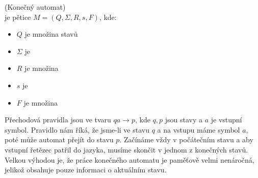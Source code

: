 \begin{defn} (Konečný automat)\\
   je pětice $M = (Q, \Sigma, R, s, F)$, kde:
  \begin{itemize}
    \item $Q$ je množina stavů
    \item $\Sigma$ je 
    \item $R$ je množina 
    \item $s$ je 
    \item $F$ je množina 
  \end{itemize}
\end{defn}

Přechodová pravidla jsou ve tvaru $qa \rightarrow p$, kde $q, p$ jsou stavy a
$a$ je vstupní symbol. Pravidlo nám říká, že jsme-li ve stavu $q$ a na vstupu
máme symbol $a$, poté může automat přejít do stavu $p$.
Začínáme vždy v počátečním stavu a aby vstupní řetězec patřil do jazyka,
musíme skončit v jednom z konečných stavů.
Velkou výhodou je, že práce konečného automatu je paměťově velmi nenáročná,
jelikož obsahuje pouze informaci o aktuálním stavu.

